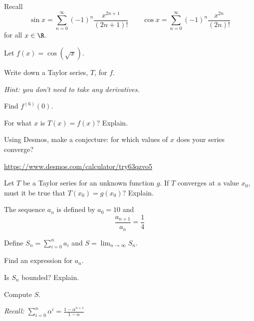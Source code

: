 \documentclass{workbook}
\begin{document}
\begin{slide}
	\question
	Recall 
	\[
		\sin x = \sum_{n=0}^\infty (-1)^n\frac{x^{2n+1}}{(2n+1)!}
		\qquad
		\cos x = \sum_{n=0}^\infty (-1)^n\frac{x^{2n}}{(2n)!}
	\]
	for all $x\in\R$.

	Let $f(x)=\cos(\sqrt{x})$.

	\begin{parts}
		\item Write down a Taylor series, $T$, for $f$.

		\emph{Hint: you don't need to take any derivatives.}

		\item Find $f^{(6)}(0)$.
		
		\item For what $x$ is $T(x)=f(x)$? Explain.

		\item Using Desmos, make a conjecture: for which values of $x$ does your series converge?

		{\small\url{https://www.desmos.com/calculator/try63qzvo5}}

		\item Let $T$ be a Taylor series for an unknown function $g$.
		If $T$ converges at a value $x_0$, must it be true that $T(x_0)=g(x_0)$?
		Explain. 

	\end{parts}
\end{slide}


\begin{slide}
	\question%
	\label{geomseq}
	The sequence $a_n$ is defined by $a_0=10$ and
	\[
		\frac{a_{n+1}}{a_n}= \frac{1}{4}
	\]

	Define $\displaystyle S_n=\sum_{i=0}^n a_i$ and 
	$\displaystyle S=\lim_{n\to\infty} S_n$.

	\begin{parts}
		\item  Find an expression for $a_n$.
		\item Is $S_n$ bounded? Explain.
		\item Compute $S$.

		\emph{Recall: 
		$\displaystyle
			\sum_{i=0}^n \alpha^i = \frac{1-\alpha^{n+1}}{1-\alpha}
		$}

	\end{parts}
\end{slide}
\end{document}
